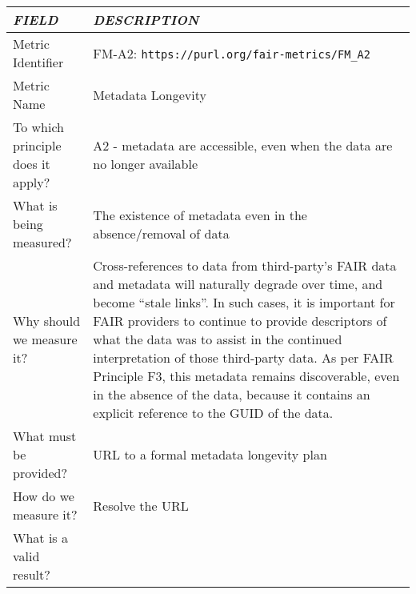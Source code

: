 \documentclass[english]{article}
\begin{document}
\begin{longtable}{|p{5cm}|p{9cm}|}


\hline
\emph{FIELD} & \emph{DESCRIPTION} \\
\hline
Metric Identifier &   FM-A2: \verb"https://purl.org/fair-metrics/FM_A2"
\\


\hline
Metric Name &   


Metadata Longevity


 \\



\hline
To which principle does it apply? &   


A2 - metadata are accessible, even when the data are no longer available

\\



\hline
What is being measured? & 


The existence of metadata even in the absence/removal of data


\\



\hline
Why should we measure it? & 



Cross-references to data from third-party’s FAIR data and metadata will naturally degrade over time, and become “stale links”.  In such cases, it is important for FAIR providers to continue to provide descriptors of what the data was to assist in the continued interpretation of those third-party data.  As per FAIR Principle F3, this metadata remains discoverable, even in the absence of the data, because it contains an explicit reference to the GUID of the data.
  
\\



\hline
What must be provided? &  


URL to a formal metadata longevity plan


\\



\hline
How do we measure it? &  

Resolve the URL


\\



\hline
What is a valid result? &  




\end{longtable}
\end{document}
